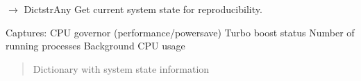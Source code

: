 \documentclass[letterpaper,10pt,english]{sphinxmanual}
\begin{document}

\begin{fulllineitems}
\label{\detokenize{core.utils.idle_baseline:core.utils.idle_baseline.get_system_state}}
\pysigstartsignatures
\pysiglinewithargsret
{}
{}
{{ $\rightarrow$ Dict\DUrole{p}{{[}}strAny\DUrole{p}{{]}}}}
\pysigstopsignatures
\sphinxAtStartPar
Get current system state for reproducibility.

\sphinxAtStartPar
Captures:
\sphinxhyphen{} CPU governor (performance/powersave)
\sphinxhyphen{} Turbo boost status
\sphinxhyphen{} Number of running processes
\sphinxhyphen{} Background CPU usage
\begin{quote}\begin{description}
\sphinxAtStartPar
Dictionary with system state information

\end{description}\end{quote}

\end{fulllineitems}

\end{document}
